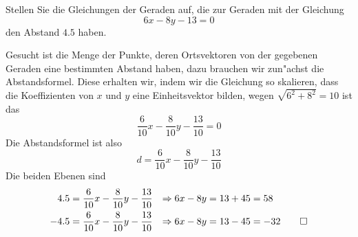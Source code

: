 Stellen Sie die Gleichungen der Geraden auf, die zur Geraden mit der
Gleichung
\[
6x-8y-13=0
\]
den Abstand $4.5$ haben.

\begin{loesung}
Gesucht ist die Menge der Punkte, deren Ortsvektoren von der gegebenen
Geraden eine bestimmten Abstand haben, dazu brauchen wir zun"achst die
Abstandsformel. Diese erhalten wir, indem wir die Gleichung so skalieren,
dass die Koeffizienten von $x$ und $y$ eine Einheitsvektor bilden,
wegen $\sqrt{6^2+8^2}=10$ ist das
\[
\frac{6}{10}x-\frac{8}{10}y-\frac{13}{10}=0
\]
Die Abstandsformel ist also
\[
d =\frac{6}{10}x-\frac{8}{10}y-\frac{13}{10}
\]
Die beiden Ebenen sind
\begin{align*}
4.5&=\frac{6}{10}x-\frac{8}{10}y-\frac{13}{10}&\Rightarrow
6x-8y&=13+45=58
\\
-4.5&=\frac{6}{10}x-\frac{8}{10}y-\frac{13}{10}&\Rightarrow
6x-8y&=13-45=-32
\qedhere
\end{align*}
\end{loesung}

